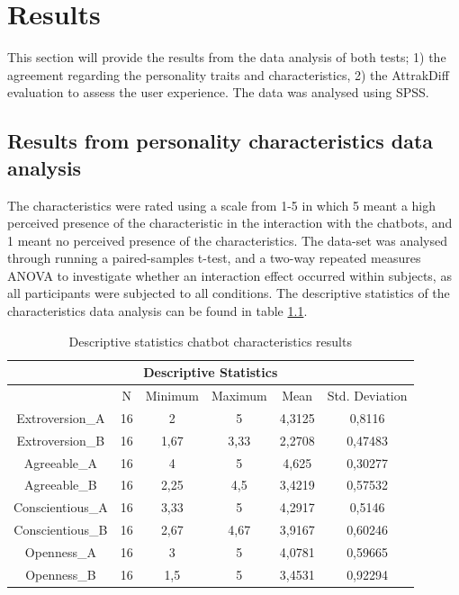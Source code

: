 \chapter{Results}
\label{chap:results}

This section will provide the results from the data analysis of both tests; 1) the agreement regarding the personality traits and characteristics, 2) the AttrakDiff evaluation to assess the user experience. The data was analysed using SPSS.

\section{Results from personality characteristics data analysis}

The characteristics were rated using a scale from 1-5 in which 5 meant a high perceived presence of the characteristic in the interaction with the chatbots, and 1 meant no perceived presence of the characteristics. The data-set was analysed through running a paired-samples t-test, and a two-way repeated measures ANOVA to investigate whether an interaction effect occurred within subjects, as all participants were subjected to all conditions. The descriptive statistics of the characteristics data analysis can be found in table \ref{table:5}.

\begin{table}[h]
\centering
\begin{tabular}{cccccc}
\hline
\multicolumn{6}{c}{\textbf{Descriptive Statistics}} \\
\hline
& N & Minimum & Maximum & Mean & Std. Deviation \\
Extroversion_A & 16 & 2 & 5 & 4,3125 & 0,8116 \\
Extroversion_B & 16 & 1,67 & 3,33 & 2,2708 & 0,47483 \\
Agreeable_A & 16 & 4 & 5 & 4,625 & 0,30277 \\
Agreeable_B & 16 & 2,25 & 4,5 & 3,4219 & 0,57532 \\
Conscientious_A & 16 & 3,33 & 5 & 4,2917 & 0,5146 \\
Conscientious_B & 16 & 2,67 & 4,67 & 3,9167 & 0,60246 \\
Openness_A & 16 & 3 & 5 & 4,0781 & 0,59665 \\
Openness_B & 16 & 1,5 & 5 & 3,4531 & 0,92294 \\
\end{tabular}
 \caption{Descriptive statistics chatbot characteristics results}
 \label{table:5}
    \end{table}

